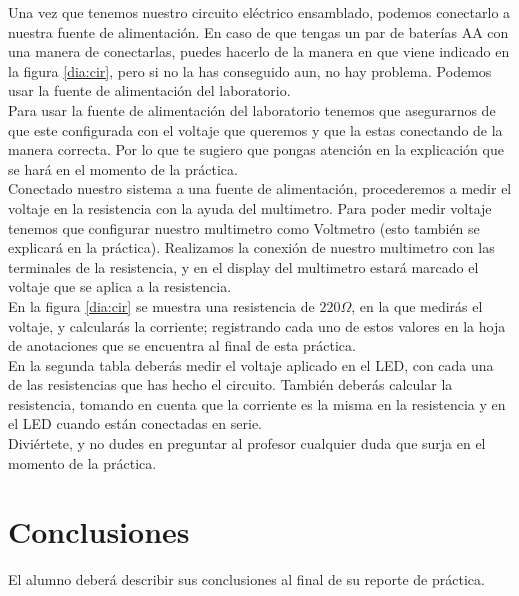 \documentclass[paper=letter, fontsize=11pt]{scrartcl} %
\numberwithin{equation}{section} %
\numberwithin{figure}{section} %
\numberwithin{table}{section} %
\begin{document}
    Una vez que tenemos nuestro circuito eléctrico ensamblado, podemos conectarlo a nuestra fuente de alimentación. En caso de que tengas un par de baterías AA con una manera de conectarlas, puedes hacerlo de la manera en que viene indicado en la figura \ref{dia:cir}, pero si no la has conseguido aun, no hay problema. Podemos usar la fuente de alimentación del laboratorio. \\

    Para usar la fuente de alimentación del laboratorio tenemos que asegurarnos de que este configurada con el voltaje que queremos y que la estas conectando de la manera correcta. Por lo que te sugiero que pongas atención en la explicación que se hará en el momento de la práctica. \\

    Conectado nuestro sistema a una fuente de alimentación, procederemos a medir el voltaje en la resistencia con la ayuda del multimetro. Para poder medir voltaje tenemos que configurar nuestro multimetro como Voltmetro (esto también se explicará en la práctica). Realizamos la conexión de nuestro multimetro con las terminales de la resistencia, y en el display del multimetro estará marcado el voltaje que se aplica a la resistencia. \\

    En la figura \ref{dia:cir} se muestra una resistencia de $220 \Omega$, en la que medirás el voltaje, y calcularás la corriente; registrando cada uno de estos valores en la hoja de anotaciones que se encuentra al final de esta práctica. \\

    En la segunda tabla deberás medir el voltaje aplicado en el LED, con cada una de las resistencias que has hecho el circuito. También deberás calcular la resistencia, tomando en cuenta que la corriente es la misma en la resistencia y en el LED cuando están conectadas en serie. \\

    Diviértete, y no dudes en preguntar al profesor cualquier duda que surja en el momento de la práctica. \\


\section{Conclusiones}
	El alumno deberá describir sus conclusiones al final de su reporte de práctica.
    
\end{document}

